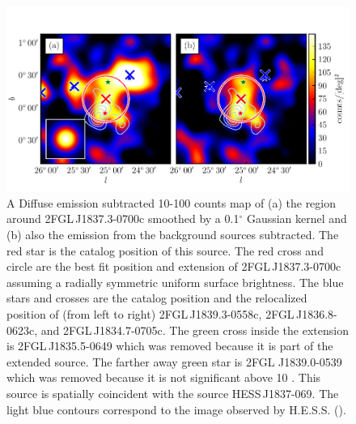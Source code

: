 \documentclass[12pt,preprint]{aastex}
\newcommand{\gev}{\text{GeV}\xspace}
\newcommand{\tev}{\text{TeV}\xspace}
\renewcommand{\deg}{\ensuremath{^\circ}\xspace}
\begin{document}
\begin{figure}
  \begin{center}
    \includegraphics[type=pdf,ext=.pdf,read=.pdf]{source_plots/source_1FGL_J1837.5-0659c}
  \end{center}
  \caption{
  A Diffuse emission subtracted 10-100 \gev counts map of
  (a)
  the region around 2FGL\,J1837.3-0700c smoothed by a 0.1\deg Gaussian
  kernel and (b) also the emission from the background 
  sources subtracted.  The red
  star is the catalog position of this source. The red cross and circle
  are the best fit position and extension  of 2FGL\,J1837.3-0700c 
  assuming a radially
  symmetric uniform surface brightness. The blue stars and crosses are the
  catalog position and the relocalized position of (from left to right)
  2FGL\,J1839.3-0558c, 2FGL\,J1836.8-0623c, and 2FGL\,J1834.7-0705c.
  The green cross inside the extension is 2FGL\,J1835.5-0649 which
  was removed because it is part of the extended source.  The farther
  away green star is 2FGL J1839.0-0539 which was removed because
  it is not significant above 10 \gev.  This source is spatially
  coincident with the \tev source HESS\,J1837-069.  The light blue
  contours correspond to the \tev image observed by H.E.S.S.
  (\cite{hess_plane_survey}).  }\label{1FGL_J1837.5-0659c}
\end{figure}
\end{document}
